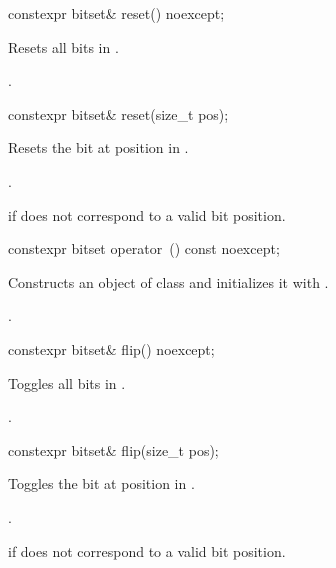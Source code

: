 %
\begin{itemdecl}
constexpr bitset& reset() noexcept;
\end{itemdecl}

\begin{itemdescr}
\pnum
\effects
Resets all bits in
.

\pnum
\returns
{}.
\end{itemdescr}

%
\begin{itemdecl}
constexpr bitset& reset(size_t pos);
\end{itemdecl}

\begin{itemdescr}
\pnum
\effects
Resets the bit at position  in
.

\pnum
\returns
{}.

\pnum
\throws
{}%
 if  does not correspond to a valid bit position.
\end{itemdescr}

%
\begin{itemdecl}
constexpr bitset operator~() const noexcept;
\end{itemdecl}

\begin{itemdescr}
\pnum
\effects
Constructs an object  of class
and initializes it with
.

\pnum
\returns
{}.
\end{itemdescr}

%
\begin{itemdecl}
constexpr bitset& flip() noexcept;
\end{itemdecl}

\begin{itemdescr}
\pnum
\effects
Toggles all bits in
.

\pnum
\returns
{}.
\end{itemdescr}

%
\begin{itemdecl}
constexpr bitset& flip(size_t pos);
\end{itemdecl}

\begin{itemdescr}
\pnum
\effects
Toggles the bit at position  in
.

\pnum
\returns
{}.

\pnum
\throws
{}%
 if  does not correspond to a valid bit position.
\end{itemdescr}

